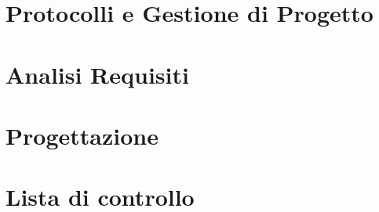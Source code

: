 \newpage
\section{Protocolli e Gestione di Progetto}


\newpage
\section{Analisi Requisiti}


\newpage
\section{Progettazione}


%

\newpage
\appendix
\section{Lista di controllo}






